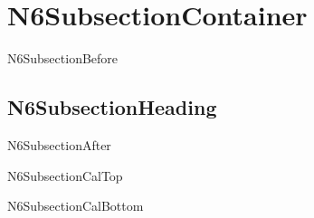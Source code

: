 \documentclass{abntexto-ufc}
\begin{document}
\textual

\section{N6SubsectionContainer}
N6SubsectionBefore

\subsection{N6SubsectionHeading}
N6SubsectionAfter

\vspace{4\baselineskip}
{\onehalfsp
\noindent N6SubsectionCalTop\par
\vspace{\baselineskip}
\noindent N6SubsectionCalBottom\par
}
\end{document}
